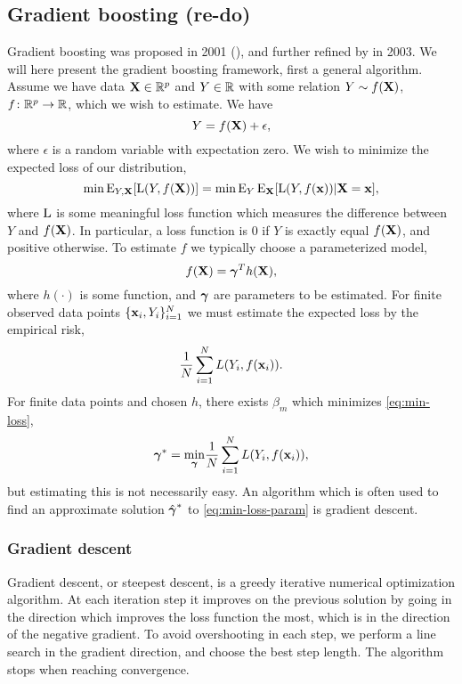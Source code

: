 \subsection*{Gradient boosting (re-do)}
Gradient boosting was proposed in 2001 (\cite{friedman2001}), and further refined by \cite{buhlmann-yu} in 2003. We will here present the gradient boosting framework, first a general algorithm.
Assume we have data $\mathbf{X}\in\mathbb{R}^p$ and $Y\in\mathbb{R}$ with some relation $Y\sim f(\mathbf{X})$, $f\colon\mathbb{R}^p\to\mathbb{R}$, which we wish to estimate. We have
\begin{equation*}
    Y=f(\mathbf{X})+\epsilon,
\end{equation*}
where $\epsilon$ is a random variable with expectation zero. We wish to minimize the expected loss of our distribution,
\begin{equation}\label{eq:min-loss}
    \min\operatorname{E}_{Y,\mathbf{X}}[\operatorname{L}(Y,f(\mathbf{X}))]=\min\operatorname{E}_Y\operatorname{E}_{\mathbf{X}}[\operatorname{L}(Y,f(\mathbf{x}))|\mathbf{X}=\mathbf{x}],
\end{equation}
where $\operatorname{L}$ is some meaningful loss function which measures the difference between $Y$ and $f(\mathbf{X})$. In particular, a loss function is 0 if $Y$ is exactly equal $f(\mathbf{X})$, and positive otherwise. To estimate $f$ we typically choose a parameterized model,
\begin{equation}
    f(\mathbf{X})=\boldsymbol{\gamma}^Th(\mathbf{X}),
\end{equation}
where $h(\cdot)$ is some function, and $\boldsymbol{\gamma}$ are parameters to be estimated. For finite observed data points $\{\mathbf{x}_i,Y_i\}_{i=1}^N$ we must estimate the expected loss by the empirical risk,
\begin{equation}
    \frac{1}{N}\sum_{i=1}^NL(Y_i,f(\mathbf{x}_i)).
\end{equation}
For finite data points and chosen $h$, there exists $\beta_m$ which minimizes \eqref{eq:min-loss},
\begin{equation}\label{eq:min-loss-param}
    \boldsymbol{\gamma}^*=\underset{\boldsymbol{\gamma}}{\min}\frac{1}{N}\sum_{i=1}^NL(Y_i,f(\mathbf{x}_i)),
\end{equation}
but estimating this is not necessarily easy. An algorithm which is often used to find an approximate solution $\hat{\boldsymbol{\gamma}}^*$ to \ref{eq:min-loss-param} is gradient descent.

\subsubsection{Gradient descent}
Gradient descent, or steepest descent, is a greedy iterative numerical optimization algorithm. At each iteration step it improves on the previous solution by going in the direction which improves the loss function the most, which is in the direction of the negative gradient. To avoid overshooting in each step, we perform a line search in the gradient direction, and choose the best step length. The algorithm stops when reaching convergence.

